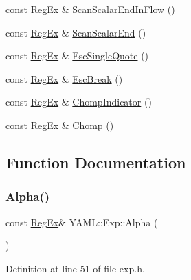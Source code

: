 \begin{DoxyCompactItemize}
\item 
const \mbox{\hyperlink{class_y_a_m_l_1_1_reg_ex}{Reg\+Ex}} \& \mbox{\hyperlink{namespace_y_a_m_l_1_1_exp_ae696c151140fd5d3b0fd16a69133d8db}{Scan\+Scalar\+End\+In\+Flow}} ()
\item 
const \mbox{\hyperlink{class_y_a_m_l_1_1_reg_ex}{Reg\+Ex}} \& \mbox{\hyperlink{namespace_y_a_m_l_1_1_exp_ae66ae8d486fd7ccbbc1aa67b067f2412}{Scan\+Scalar\+End}} ()
\item 
const \mbox{\hyperlink{class_y_a_m_l_1_1_reg_ex}{Reg\+Ex}} \& \mbox{\hyperlink{namespace_y_a_m_l_1_1_exp_a2bd56c19ae80e5c410a775f95270d2e4}{Esc\+Single\+Quote}} ()
\item 
const \mbox{\hyperlink{class_y_a_m_l_1_1_reg_ex}{Reg\+Ex}} \& \mbox{\hyperlink{namespace_y_a_m_l_1_1_exp_aa025e6598b92e5e5eff13736eba4b325}{Esc\+Break}} ()
\item 
const \mbox{\hyperlink{class_y_a_m_l_1_1_reg_ex}{Reg\+Ex}} \& \mbox{\hyperlink{namespace_y_a_m_l_1_1_exp_a951a08534d9d41ff1c0758efa1265f76}{Chomp\+Indicator}} ()
\item 
const \mbox{\hyperlink{class_y_a_m_l_1_1_reg_ex}{Reg\+Ex}} \& \mbox{\hyperlink{namespace_y_a_m_l_1_1_exp_aca3cd79f5c53a3e165058228e7d45441}{Chomp}} ()
\end{DoxyCompactItemize}


\subsection{Function Documentation}
\mbox{\label{namespace_y_a_m_l_1_1_exp_a860c40796895dd222b312d735bd61885}} 
\subsubsection{\texorpdfstring{Alpha()}{Alpha()}}
{\footnotesize\ttfamily const \mbox{\hyperlink{class_y_a_m_l_1_1_reg_ex}{Reg\+Ex}}\& Y\+A\+M\+L\+::\+Exp\+::\+Alpha (\begin{DoxyParamCaption}{ }\end{DoxyParamCaption})\hspace{0.3cm}{\ttfamily [inline]}}



Definition at line 51 of file exp.\+h.

\mbox{\label{namespace_y_a_m_l_1_1_exp_a715a4903783c809c0baec851534355a7}} 
